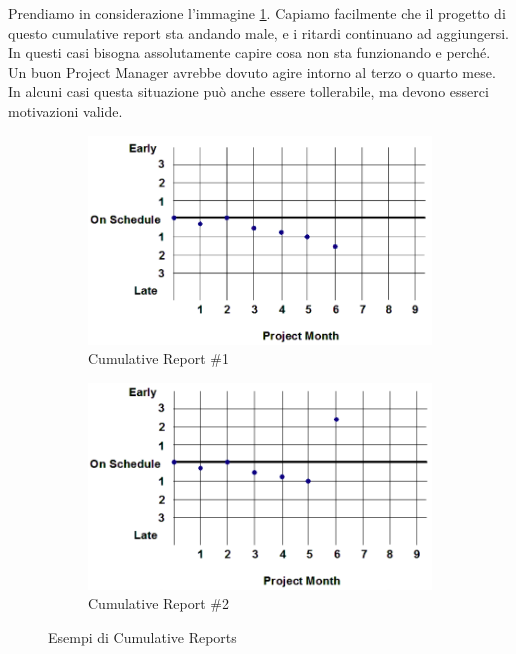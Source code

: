 \noindent Prendiamo in considerazione l'immagine \ref{cumreport1}. Capiamo facilmente che il progetto di questo cumulative report sta andando male, e i ritardi continuano ad aggiungersi. In questi casi bisogna assolutamente capire cosa non sta funzionando e perché. Un buon Project Manager avrebbe dovuto agire intorno al terzo o quarto mese. In alcuni casi questa situazione può anche essere tollerabile, ma devono esserci motivazioni valide.
\begin{figure}[H]
	\centering
	\begin{subfigure}[b]{0.45\textwidth}
		\centering
		\includegraphics[width=\textwidth]{document/img/cumreport1.png}
		\caption{Cumulative Report \#1}
		\label{cumreport1}
	\end{subfigure}
	\hfill
	\begin{subfigure}[b]{0.45\textwidth}
		\centering
		\includegraphics[width=\textwidth]{document/img/cumreport2.png}
		\caption{Cumulative Report \#2}
		\label{cumreport2}
	\end{subfigure}
	\caption{Esempi di Cumulative Reports}
\end{figure}

